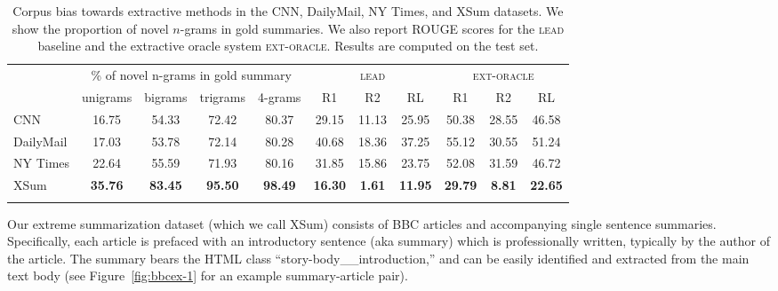 \begin{table}
  \begin{center}{\footnotesize
  \begin{tabular}{ l | c c c c | c c c | c c c } %
    \thickhline
    \multirow{2}{*}{Datasets} & \multicolumn{4}{c|}{\% of novel n-grams in gold summary} & \multicolumn{3}{c|}{\textsc{lead}} & \multicolumn{3}{c}{\textsc{ext-oracle}} \\
    & unigrams & bigrams & trigrams & 4-grams & R1 & R2 & RL & R1 & R2 & RL \\ \thickhline 
    CNN & 16.75 & 54.33 & 72.42 & 80.37 & 29.15 & 11.13 & 25.95 & 50.38 & 28.55 & 46.58 \\
    DailyMail & 17.03 & 53.78 & 72.14 & 80.28 & 40.68 & 18.36 & 37.25 & 55.12 & 30.55 & 51.24 \\
    NY Times & 22.64 & 55.59 & 71.93 & 80.16 & 31.85 & 15.86 & 23.75 & 52.08 & 31.59 & 46.72 \\
    XSum & \textbf{35.76} & \textbf{83.45}  & \textbf{95.50}  & \textbf{98.49}  & \textbf{16.30} & \textbf{1.61}  & \textbf{11.95}  & \textbf{29.79}  & \textbf{8.81}  & \textbf{22.65}  \\ \thickhline
  \end{tabular}}
  \end{center}
  \caption{Corpus bias towards extractive methods in the CNN,
    DailyMail, NY Times, and XSum datasets.  We show  the proportion of novel $n$-grams in gold summaries. We also report ROUGE scores  for
    the  \textsc{lead} baseline and the extractive oracle system
    \textsc{ext-oracle}.     Results
    are computed on the test set.
    \label{table:ngram-coverage-lead-oracle}}
\end{table}




Our extreme summarization dataset (which we call XSum) consists of BBC
articles and accompanying single sentence summaries. Specifically,
each article is prefaced with an introductory sentence (aka summary)
which is professionally written, typically by the author of the
article. The summary bears the HTML class
``story-body\_\_introduction,'' and can be easily identified and
extracted from the main text body (see Figure~\ref{fig:bbcex-1} for an
example summary-article pair).



